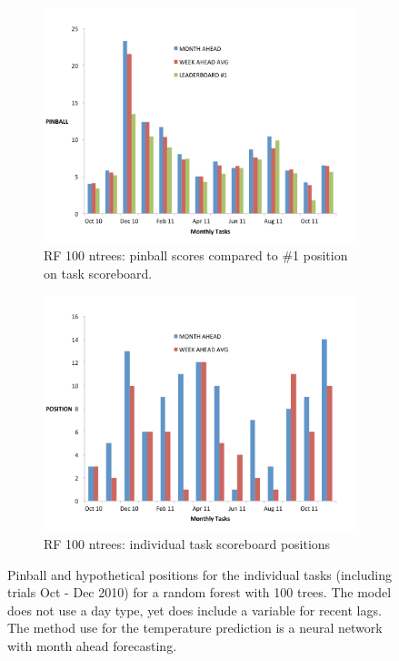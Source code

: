 \documentclass[conference]{IEEEtran}
\begin{document}
\begin{figure}[!ht]
\centering
\begin{subfigure}[b]{\linewidth}
\includegraphics[width=\linewidth]{gfx/results/load/LOAD-BEST-PINBALL.pdf}
\caption{RF 100 ntrees: pinball scores compared to \#1 position on task scoreboard.}
\label{subfig:final-pinball}
\end{subfigure}
\begin{subfigure}[b]{\linewidth}
\includegraphics[width=\linewidth]{gfx/results/load/LOAD-BEST-POSITION.pdf}
\caption{RF 100 ntrees: individual task scoreboard positions}
\label{subfig:task-pos}
\end{subfigure}
\caption{Pinball and hypothetical positions for the individual tasks (including trials Oct - Dec 2010) for a random forest with 100 trees. The model does not use a day type, yet does include a variable for recent lags. The method use for the temperature prediction is a neural network with month ahead forecasting.}
\label{fig:load-final}
\end{figure}
\end{document}
